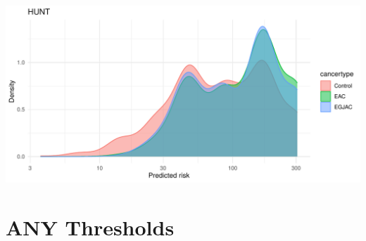 \documentclass[12pt]{article}
\begin{document}
\begin{center}
\includegraphics[width=1.0\textwidth]{figures/risk_distributions/HUNT.pdf}
\end{center}

\clearpage

\section*{ANY Thresholds}
\end{document}
